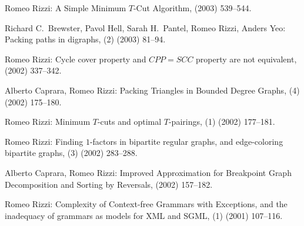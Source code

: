 \begin{etaremune}
  \item {\sc Romeo Rizzi:}
   \newblock  A Simple Minimum $T$-Cut Algorithm,
    (2003) 539--544.

  \item {\sc Richard C.~Brewster, Pavol Hell, Sarah H.~Pantel, Romeo Rizzi, Anders Yeo:}
   \newblock  Packing paths in digraphs,
   (2) (2003) 81--94.

  \item {\sc Romeo Rizzi:}
   \newblock  Cycle cover property and $CPP=SCC$ property are not equivalent,
    (2002) 337--342.

  \item {\sc Alberto Caprara, Romeo Rizzi:}
   \newblock  Packing Triangles in Bounded Degree Graphs,
   (4) (2002) 175--180.

  \item {\sc Romeo Rizzi:}
   \newblock  Minimum $T$-cuts and optimal $T$-pairings,
   (1) (2002) 177--181.

  \item {\sc Romeo Rizzi:}
   \newblock  Finding $1$-factors in bipartite regular graphs,
              and edge-coloring bipartite graphs,
   (3) (2002) 283--288. 

  \item {\sc Alberto Caprara, Romeo Rizzi:}
   \newblock  Improved Approximation for Breakpoint Graph Decomposition
              and Sorting by Reversals,
    (2002) 157--182.

  \item {\sc Romeo Rizzi:}
   \newblock  Complexity of Context-free Grammars with Exceptions,
              and the inadequacy of grammars as models for XML and SGML,
   (1) (2001) 107--116.


\end{etaremune}
